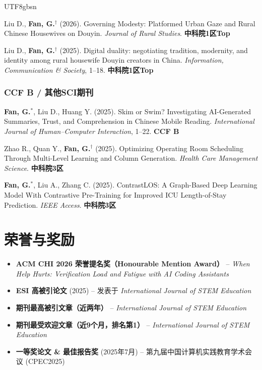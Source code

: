 \documentclass[a4paper,10pt]{article}
\newcommand{\pubitem}[1]{\item #1}
\begin{document}
\begin{CJK*}{UTF8}{gbsn}
\begin{enumerate}[label={[J\arabic*]}]
    \pubitem{Liu D., \textbf{Fan, G.}$^\dag$ (2026). Governing Modesty: Platformed Urban Gaze and Rural Chinese Housewives on Douyin. \textit{Journal of Rural Studies}. \textbf{中科院1区Top}}
    
    \pubitem{Liu D., \textbf{Fan, G.}$^\dag$ (2025). Digital duality: negotiating tradition, modernity, and identity among rural housewife Douyin creators in China. \textit{Information, Communication \& Society}, 1--18. \textbf{中科院1区Top}}
\end{enumerate}

\subsubsection*{CCF B / 其他SCI期刊}

\begin{enumerate}[label={[J\arabic*]}, resume]
    \pubitem{\textbf{Fan, G.}$^*$, Liu D., Huang Y. (2025). Skim or Swim? Investigating AI-Generated Summaries, Trust, and Comprehension in Chinese Mobile Reading. \textit{International Journal of Human--Computer Interaction}, 1--22. \textbf{CCF B}}
    
    \pubitem{Zhao R., Quan Y., \textbf{Fan, G.}$^\dag$ (2025). Optimizing Operating Room Scheduling Through Multi-Level Learning and Column Generation. \textit{Health Care Management Science}. \textbf{中科院3区}}
    
    \pubitem{\textbf{Fan, G.}$^*$, Liu A., Zhang C. (2025). ContrastLOS: A Graph-Based Deep Learning Model With Contrastive Pre-Training for Improved ICU Length-of-Stay Prediction. \textit{IEEE Access}. \textbf{中科院3区}}
\end{enumerate}

\section*{荣誉与奖励}

\begin{itemize}[leftmargin=*]
    \item \textbf{ACM CHI 2026 荣誉提名奖（Honourable Mention Award）} -- \textit{When Help Hurts: Verification Load and Fatigue with AI Coding Assistants}
    \item \textbf{ESI 高被引论文} (2025) -- 发表于 \textit{International Journal of STEM Education}
    \item \textbf{期刊最高被引文章（近两年）} -- \textit{International Journal of STEM Education}
    \item \textbf{期刊最受欢迎文章（近9个月，排名第1）} -- \textit{International Journal of STEM Education}
    \item \textbf{一等奖论文 \& 最佳报告奖} (2025年7月) -- 第九届中国计算机实践教育学术会议 (CPEC2025)
\end{itemize}


\end{CJK*}
\end{document}
